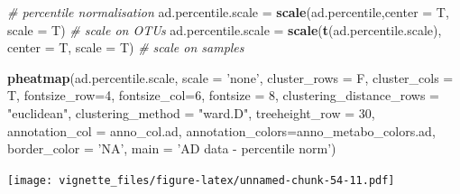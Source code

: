 \documentclass[]{book}
\newenvironment{Shaded}{\begin{snugshade}}{\end{snugshade}}
\newcommand{\KeywordTok}[1]{\textcolor[rgb]{0.13,0.29,0.53}{\textbf{#1}}}
\newcommand{\DataTypeTok}[1]{\textcolor[rgb]{0.13,0.29,0.53}{#1}}
\newcommand{\DecValTok}[1]{\textcolor[rgb]{0.00,0.00,0.81}{#1}}
\newcommand{\StringTok}[1]{\textcolor[rgb]{0.31,0.60,0.02}{#1}}
\newcommand{\CommentTok}[1]{\textcolor[rgb]{0.56,0.35,0.01}{\textit{#1}}}
\newcommand{\NormalTok}[1]{#1}
\begin{document}
\begin{Shaded}
\begin{Highlighting}[]
\CommentTok{# percentile normalisation}
\NormalTok{ad.percentile.scale =}\StringTok{ }\KeywordTok{scale}\NormalTok{(ad.percentile,}\DataTypeTok{center =}\NormalTok{ T, }\DataTypeTok{scale =}\NormalTok{ T) }\CommentTok{# scale on OTUs}
\NormalTok{ad.percentile.scale =}\StringTok{ }\KeywordTok{scale}\NormalTok{(}\KeywordTok{t}\NormalTok{(ad.percentile.scale), }\DataTypeTok{center =}\NormalTok{ T, }\DataTypeTok{scale =}\NormalTok{ T) }\CommentTok{# scale on samples}

\KeywordTok{pheatmap}\NormalTok{(ad.percentile.scale, }
         \DataTypeTok{scale =} \StringTok{'none'}\NormalTok{, }
         \DataTypeTok{cluster_rows =}\NormalTok{ F, }
         \DataTypeTok{cluster_cols =}\NormalTok{ T, }
         \DataTypeTok{fontsize_row=}\DecValTok{4}\NormalTok{, }\DataTypeTok{fontsize_col=}\DecValTok{6}\NormalTok{,}
         \DataTypeTok{fontsize =} \DecValTok{8}\NormalTok{,}
         \DataTypeTok{clustering_distance_rows =} \StringTok{"euclidean"}\NormalTok{,}
         \DataTypeTok{clustering_method =} \StringTok{"ward.D"}\NormalTok{,}
         \DataTypeTok{treeheight_row =} \DecValTok{30}\NormalTok{,}
         \DataTypeTok{annotation_col =}\NormalTok{ anno_col.ad,}
         \DataTypeTok{annotation_colors=}\NormalTok{anno_metabo_colors.ad,}
         \DataTypeTok{border_color =} \StringTok{'NA'}\NormalTok{,}
         \DataTypeTok{main =} \StringTok{'AD data - percentile norm'}\NormalTok{)}
\end{Highlighting}
\end{Shaded}

\texttt{[image: vignette\_files/figure-latex/unnamed-chunk-54-11.pdf]}
\end{document}
